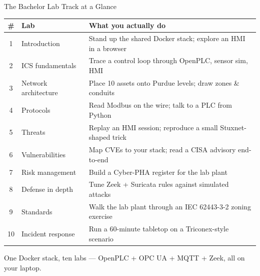\documentclass[aspectratio=169,11pt]{beamer}
\begin{document}
\begin{frame}{The Bachelor Lab Track at a Glance}
\centering
\renewcommand{\arraystretch}{1.05}
\scriptsize
\begin{tabular}{|c|l|l|}
\hline
\rowcolor{isMute!20}
\textbf{\#} & \textbf{Lab} & \textbf{What you actually do}\\
\hline
1 & Introduction & Stand up the shared Docker stack; explore an HMI in a browser\\
\hline
2 & ICS fundamentals & Trace a control loop through OpenPLC, sensor sim, HMI\\
\hline
3 & Network architecture & Place 10 assets onto Purdue levels; draw zones \& conduits\\
\hline
4 & Protocols & Read Modbus on the wire; talk to a PLC from Python\\
\hline
5 & Threats & Replay an HMI session; reproduce a small Stuxnet-shaped trick\\
\hline
6 & Vulnerabilities & Map CVEs to your stack; read a CISA advisory end-to-end\\
\hline
7 & Risk management & Build a Cyber-PHA register for the lab plant\\
\hline
8 & Defense in depth & Tune Zeek + Suricata rules against simulated attacks\\
\hline
9 & Standards & Walk the lab plant through an IEC 62443-3-2 zoning exercise\\
\hline
10 & Incident response & Run a 60-minute tabletop on a Triconex-style scenario\\
\hline
\end{tabular}
\par\vspace{2mm}
{\footnotesize One Docker stack, ten labs --- OpenPLC + OPC UA + MQTT + Zeek, all on your laptop.}
\end{frame}
\end{document}
